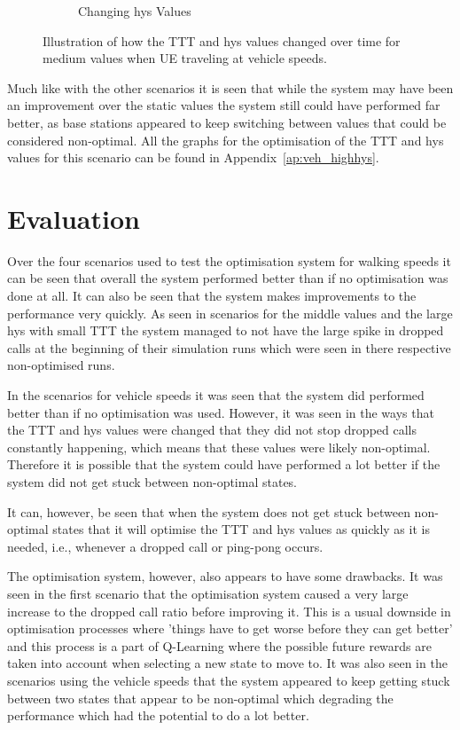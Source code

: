 \begin{figure}[H]
\begin{subfigure}[b]{0.49\textwidth}
                \caption{Changing hys Values}
                \label{fig:veh_highhys_hys}
        \end{subfigure}
        \caption{Illustration of how the TTT and hys values changed over time for medium values when UE traveling at vehicle speeds.}\label{fig:veh_highhys_ttthys}
\end{figure}
Much like with the other scenarios it is seen that while the system may have been an improvement over the static values the system still could have performed far better, as base stations appeared to keep switching between values that could be considered non-optimal. All the graphs for the optimisation of the TTT and hys values for this scenario can be found in Appendix~\ref{ap:veh_highhys}.
\section{Evaluation}
Over the four scenarios used to test the optimisation system for walking speeds it can be seen that overall the system performed better than if no optimisation was done at all. It can also be seen that the system makes improvements to the performance very quickly. As seen in scenarios for the middle values and the large hys with small TTT the system managed to not have the large spike in dropped calls at the beginning of their simulation runs which were seen in there respective non-optimised runs.

In the scenarios for vehicle speeds it was seen that the system did performed better than if no optimisation was used. However, it was seen in the ways that the TTT and hys values were changed that they did not stop dropped calls constantly happening, which means that these values were likely non-optimal. Therefore it is possible that the system could have performed a lot better if the system did not get stuck between non-optimal states.

It can, however, be seen that when the system does not get stuck between non-optimal states that it will optimise the TTT and hys values as quickly as it is needed, i.e., whenever a dropped call or ping-pong occurs.

The optimisation system, however, also appears to have some drawbacks. It was seen in the first scenario that the optimisation system caused a very large increase to the dropped call ratio before improving it. This is a usual downside in optimisation processes where 'things have to get worse before they can get better' and this process is a part of Q-Learning where the possible future rewards are taken into account when selecting a new state to move to. It was also seen in the scenarios using the vehicle speeds that the system appeared to keep getting stuck between two states that appear to be non-optimal which degrading the performance which had the potential to do a lot better.
